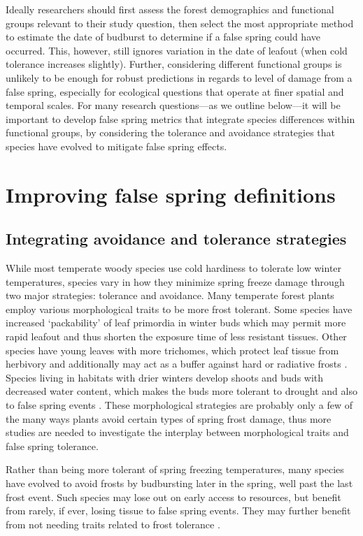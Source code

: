 \documentclass{article}\usepackage[]{graphicx}\usepackage[]{color}
\begin{document}
Ideally researchers should first assess the forest demographics and functional groups relevant to their study question, then select the most appropriate method to estimate the date of budburst to determine if a false spring could have occurred. This, however, still ignores variation in the date of leafout (when cold tolerance increases slightly). Further, considering different functional groups is unlikely to be enough for robust predictions in regards to level of damage from a false spring, especially for ecological questions that operate at finer spatial and temporal scales. For many research questions---as we outline below---it will be important to develop false spring metrics that integrate species differences within functional groups, by considering the tolerance and avoidance strategies that species have evolved to mitigate false spring effects. 

\section*{Improving false spring definitions}
\subsection*{Integrating avoidance and tolerance strategies}
While most temperate woody species use cold hardiness to tolerate low winter temperatures, species vary in how they minimize spring freeze damage through two major strategies: tolerance and avoidance. Many temperate forest plants employ various morphological traits to be more frost tolerant. Some species have increased `packability' of leaf primordia in winter buds which may permit more rapid leafout \citep{Edwards2017} and thus shorten the exposure time of less resistant tissues. Other species have young leaves with more trichomes, which protect leaf tissue from herbivory and additionally may act as a buffer against hard or radiative frosts \citep{Agrawal2004, Prozherina2003}. Species living in habitats with drier winters develop shoots and buds with decreased water content, which makes the buds more tolerant to drought and also to false spring events \citep{Beck2007, Hofmann2015, Kathke2011, Morin2007,  Muffler2016, Nielsen2009, Poirier2010}. These morphological strategies are probably only a few of the many ways plants avoid certain types of spring frost damage, thus more studies are needed to investigate the interplay between morphological traits and false spring tolerance. 

Rather than being more tolerant of spring freezing temperatures, many species have evolved to avoid frosts by budbursting later in the spring, well past the last frost event. Such species may lose out on early access to resources, but benefit from rarely, if ever, losing tissue to false spring events. They may further benefit from not needing traits related to frost tolerance \citep{Lenz2013}. 
\end{document}

